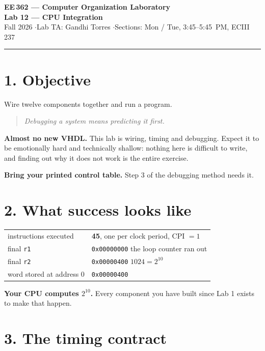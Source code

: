 \documentclass[11pt]{article}
\newcommand{\code}[1]{\texttt{#1}}
\newcommand{\hr}{\vspace{2pt}\hrule\vspace{6pt}}
\begin{document}
\begin{center}
{\Large\bfseries EE\,362 --- Computer Organization Laboratory}\\[2pt]
{\large\bfseries Lab 12 --- CPU Integration}\\[4pt]
Fall 2026 \quad$\cdot$\quad Lab TA: Gandhi Torres \quad$\cdot$\quad Sections: Mon / Tue, 3:45--5:45~PM, ECIII 237
\end{center}
\hr

\section*{1. Objective}

Wire twelve components together and run a program.

\begin{quote}
\emph{Debugging a system means predicting it first.}
\end{quote}

\textbf{Almost no new VHDL.} This lab is wiring, timing and debugging. Expect it
to be emotionally hard and technically shallow: nothing here is difficult to
write, and finding out why it does not work is the entire exercise.

\textbf{Bring your printed control table.} Step 3 of the debugging method needs
it.

\section*{2. What success looks like}

\begin{center}
\begin{tabular}{ll}
\toprule
instructions executed & \textbf{45}, one per clock period, CPI $= 1$ \\
final \code{r1} & \code{0x00000000} \quad the loop counter ran out \\
final \code{r2} & \code{0x00000400} \quad $1024 = 2^{10}$ \\
word stored at address 0 & \code{0x00000400} \\
\bottomrule
\end{tabular}
\end{center}

\textbf{Your CPU computes $2^{10}$.} Every component you have built since Lab 1
exists to make that happen.

\section*{3. The timing contract}
\end{document}
